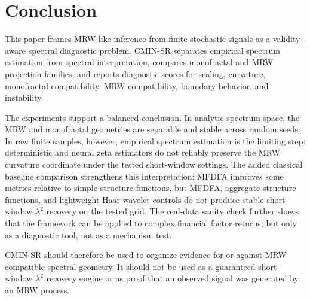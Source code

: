 \section{Conclusion}

This paper frames MRW-like inference from finite stochastic signals as a
validity-aware spectral diagnostic problem. CMIN-SR separates empirical
spectrum estimation from spectral interpretation, compares monofractal and MRW
projection families, and reports diagnostic scores for scaling, curvature,
monofractal compatibility, MRW compatibility, boundary behavior, and
instability.

The experiments support a balanced conclusion. In analytic spectrum space, the
MRW and monofractal geometries are separable and stable across random seeds.
In raw finite samples, however, empirical spectrum estimation is the limiting
step: deterministic and neural zeta estimators do not reliably preserve the
MRW curvature coordinate under the tested short-window settings. The added
classical baseline comparison strengthens this interpretation: MFDFA improves
some metrics relative to simple structure functions, but MFDFA, aggregate
structure functions, and lightweight Haar wavelet controls do not produce
stable short-window \(\lambda^2\) recovery on the tested grid. The real-data
sanity check further shows that the framework can be applied to complex
financial factor returns, but only as a diagnostic tool, not as a mechanism
test.

CMIN-SR should therefore be used to organize evidence for or against
MRW-compatible spectral geometry. It should not be used as a guaranteed
short-window \(\lambda^2\) recovery engine or as proof that an observed signal
was generated by an MRW process.
